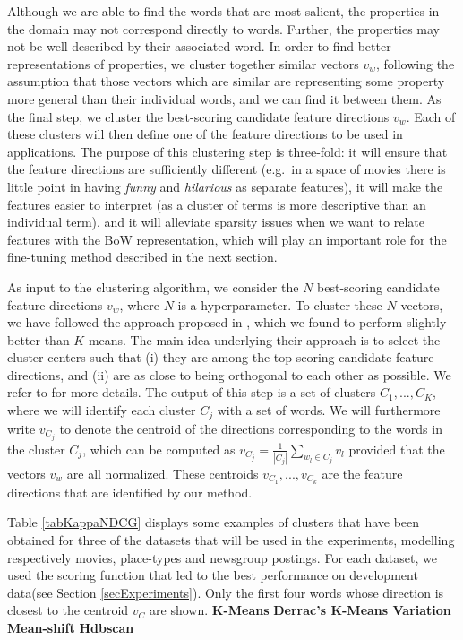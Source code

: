 Although we are able to find the words that are most salient, the properties in the domain may not correspond directly to words. Further, the properties may not be well described by their associated word. In-order to find better representations of properties, we cluster together similar vectors $v_w$, following the assumption that those vectors which are similar are representing some property more general than their individual words, and we can find it between them.
As the final step, we cluster the best-scoring candidate feature directions $v_w$. Each of these clusters will then define one of the feature directions to be used in applications. The purpose of this clustering step is three-fold: it will ensure that the feature directions are sufficiently different (e.g.\ in a space of movies there is little point in having \emph{funny} and \emph{hilarious} as separate features), it will make the features easier to interpret (as a cluster of terms is more descriptive than an individual term), and it will alleviate sparsity issues when we want to relate features with the BoW representation, which will play an important role for the fine-tuning method described in the next section.

As input to the clustering algorithm, we consider the $N$ best-scoring candidate feature directions $v_w$, where $N$ is a hyperparameter. To cluster these $N$ vectors, we have followed the approach proposed in \cite{derracAIJ}, which we found to perform slightly better than $K$-means. The main idea underlying their approach is to select the cluster centers such that (i) they are among the top-scoring candidate feature directions, and (ii) are as close to being orthogonal to each other as possible. We refer to \cite{derracAIJ} for more details. 
The output of this step is a set of clusters $C_1,...,C_K$, where we will identify each cluster $C_j$ with a set of words.
We will furthermore write $v_{C_j}$ to denote the centroid of the directions corresponding to the words in the cluster $C_j$, which can be computed as $v_{C_j}= \frac{1}{|C_j|} \sum_{w_l\in C_j} v_l$ provided that the vectors $v_w$ are all normalized. These centroids $v_{C_1},...,v_{C_k}$ are the feature directions that are identified by our method. 

Table \ref{tabKappaNDCG} displays some examples of clusters that have been obtained for three of the datasets that will be used in the experiments, modelling respectively movies, place-types and newsgroup postings. For each dataset, we used the scoring function that led to the best performance on development data(see Section \ref{secExperiments}). Only the first four words whose direction is closest to the centroid $v_C$ are shown.
\noindent \textbf{K-Means}
\noindent \textbf{Derrac's K-Means Variation}
\noindent \textbf{Mean-shift}
\noindent \textbf{Hdbscan}

